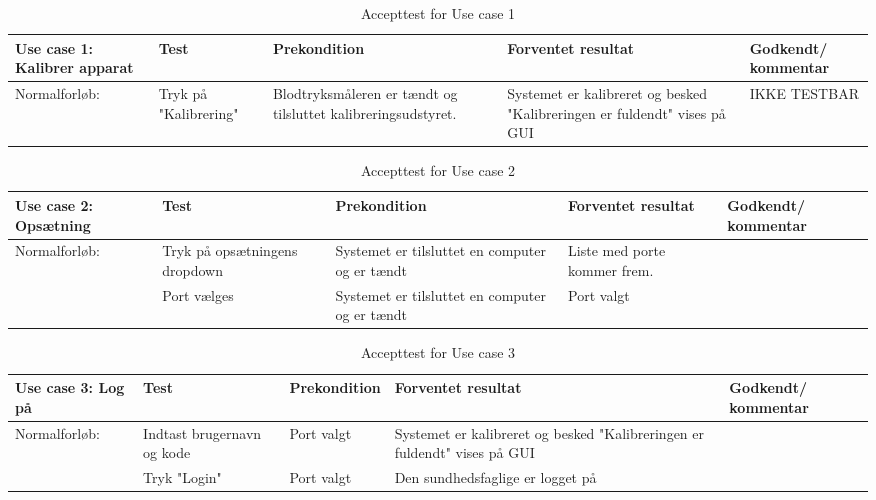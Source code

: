 \begin{table}[H]
\caption{Accepttest for Use case 1}\label{tab:tabel8}
\begin{tabular}{|>{\raggedright\arraybackslash}p{2.5cm}| >{\raggedright\arraybackslash}p{2.9cm} | >{\raggedright\arraybackslash}p{2.9cm} | >{\raggedright\arraybackslash}p{2.9cm} | >{\raggedright\arraybackslash}p{2.8cm} |}
   \hline
   \textbf{Use case 1: Kalibrer apparat} &\textbf{Test}& \textbf{Prekondition} & \textbf{Forventet resultat} & \textbf{Godkendt/ kommentar}\\ \hline
   Normalforløb:& Tryk på "Kalibrering" & Blodtryksmåleren er tændt og tilsluttet kalibreringsudstyret. & Systemet er kalibreret og besked "Kalibreringen er fuldendt" vises på GUI & IKKE TESTBAR\\\hline
\end{tabular}
\end{table}

\begin{table}[H]
\caption{Accepttest for Use case 2}\label{tab:tabel8}
\begin{tabular}{|>{\raggedright\arraybackslash}p{2.5cm}| >{\raggedright\arraybackslash}p{2.9cm} | >{\raggedright\arraybackslash}p{2.9cm} | >{\raggedright\arraybackslash}p{2.9cm} | >{\raggedright\arraybackslash}p{2.8cm} |}
   \hline
   \textbf{Use case 2: Opsætning} &\textbf{Test}& \textbf{Prekondition} & \textbf{Forventet resultat} & \textbf{Godkendt/ kommentar}\\ \hline
   Normalforløb:& Tryk på opsætningens dropdown  & Systemet er tilsluttet en computer og er tændt & Liste med porte kommer frem. & \\\hline
   &Port vælges & Systemet er tilsluttet en computer og er tændt & Port valgt &\\\hline
\end{tabular}
\end{table}

\begin{table}[H]
\caption{Accepttest for Use case 3}\label{tab:tabel8}
\begin{tabular}{|>{\raggedright\arraybackslash}p{2.5cm}| >{\raggedright\arraybackslash}p{2.9cm} | >{\raggedright\arraybackslash}p{2.9cm} | >{\raggedright\arraybackslash}p{2.9cm} | >{\raggedright\arraybackslash}p{2.8cm} |}
   \hline
   \textbf{Use case 3: Log på} &\textbf{Test}& \textbf{Prekondition} & \textbf{Forventet resultat} & \textbf{Godkendt/ kommentar}\\ \hline
   Normalforløb:& Indtast brugernavn og kode & Port valgt & Systemet er kalibreret og besked "Kalibreringen er fuldendt" vises på GUI & \\\hline
   &Tryk "Login" & Port valgt & Den sundhedsfaglige er logget på &\\\hline
\end{tabular}
\end{table}


